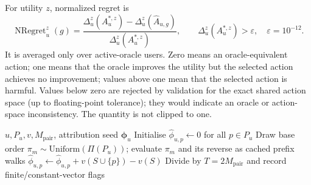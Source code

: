 \documentclass[a4paper,fleqn,doubleblind]{cas-sc}
\begin{document}
For utility $z$, normalized regret is
\begin{equation}
\operatorname{NRegret}_u^z(g)=
\frac{\Delta_u^z(A_u^{*,z})-\Delta_u^z(\widehat A_{u,g})}
{\Delta_u^z(A_u^{*,z})},
\qquad \Delta_u^z(A_u^{*,z})>\varepsilon,
\quad \varepsilon=10^{-12}.
\label{eq:nregret}
\end{equation}
It is averaged only over active-oracle users. Zero means an oracle-equivalent action; one means that the oracle improves the utility but the selected action achieves no improvement; values above one mean that the selected action is harmful. Values below zero are rejected by validation for the exact shared action space (up to floating-point tolerance); they would indicate an oracle or action-space inconsistency. The quantity is not clipped to one.

\begin{algorithm}[t]
\caption{Paired Monte Carlo attribution}
\label{alg:shapley}
\begin{algorithmic}[1]
\Require $u,P_u,v,M_{\mathrm{pair}}$, attribution seed
\Ensure $\widehat{\boldsymbol\phi}_u$
\State Initialise $\hat\phi_{u,p}\gets0$ for all $p\in P_u$
\State Draw base order $\pi_m\sim\mathrm{Uniform}(\Pi(P_u))$; evaluate $\pi_m$ and its reverse as cached prefix walks
\State $\hat\phi_{u,p}\gets\hat\phi_{u,p}+v(S\cup\{p\})-v(S)$
\EndFor
\EndFor
\State Divide by $T=2M_{\mathrm{pair}}$ and record finite/constant-vector flags
\end{algorithmic}
\end{algorithm}
\end{document}
